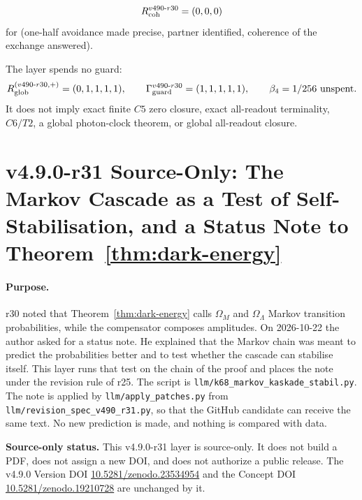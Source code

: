 \[
R_{\rm coh}^{v490\text{-}r30}=(0,0,0)
\]
for (one-half avoidance made precise, partner identified, coherence of the exchange answered).

The layer spends no guard:
\[
R_{\rm glob}^{(v490\text{-}r30,+)}=(0,1,1,1,1),
\qquad
\Gamma_{\rm guard}^{v490\text{-}r30}=(1,1,1,1,1),
\qquad
\beta_4=1/256\ \text{unspent}.
\]
It does not imply exact finite \(C5\) zero closure, exact all-readout terminality,
\(C6/T2\), a global photon-clock theorem, or global all-readout closure.

\clearpage
\section*{v4.9.0-r31 Source-Only: The Markov Cascade as a Test of Self-Stabilisation, and a Status Note to Theorem~\texorpdfstring{\ref{thm:dark-energy}}{dark-energy}}
\label{sec:v490-r31-markov-self-stabilisation}

\paragraph{Purpose.}
r30 noted that Theorem~\ref{thm:dark-energy} calls \(\Omega_M\) and \(\Omega_\Lambda\) Markov transition probabilities, while the compensator
composes amplitudes.  On 2026-10-22 the author asked for a status note.  He explained that the Markov chain was meant to predict the
probabilities better and to test whether the cascade can stabilise itself.  This layer runs that test on the chain of the proof and
places the note under the revision rule of r25.  The script is \texttt{llm/k68\_markov\_kaskade\_stabil.py}.  The note is applied by
\texttt{llm/apply\_patches.py} from \texttt{llm/revision\_spec\_v490\_r31.py}, so that the GitHub candidate can receive the same text.
No new prediction is made, and nothing is compared with data.

\noindent\textbf{Source-only status.}
This v4.9.0-r31 layer is source-only.  It does not build a PDF, does not assign a new DOI,
and does not authorize a public release.  The v4.9.0 Version DOI
\href{https://doi.org/10.5281/zenodo.23534954}{10.5281/zenodo.23534954} and the Concept DOI
\href{https://doi.org/10.5281/zenodo.19210728}{10.5281/zenodo.19210728} are unchanged by it.

